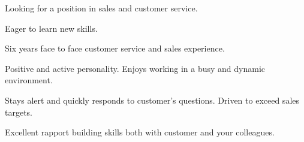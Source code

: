 

\begin{cventries}

  \cventry
    {} %
    {} %
    {} %
    {} %
    {
      \begin{cvitems} %
      \item Looking for a position in sales and customer service.
      \item Eager to learn new skills.
      \item Six years face to face customer service and sales experience.
      \item Positive and active personality.  Enjoys working in a busy and dynamic environment.
      \item Stays alert and quickly responds to customer's questions. Driven to exceed sales targets.
      \item Excellent rapport building skills both with customer and your colleagues.
      \end{cvitems}
    }


\end{cventries}
